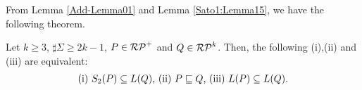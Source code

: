 From Lemma \ref{Add-Lemma01} %
and Lemma \ref{Sato1:Lemma15}, %
we have the following theorem.


\begin{thm}\label{Theorem17}%
    Let $k \geq 3$, $\sharp\Sigma \geq 2k-1$, $P \in \mathcal{RP}^{+}$ and
    $Q \in \mathcal{RP}^{k}$.
    Then, the following (i),(ii) and (iii) are equivalent:
    \[
        \begin{tabular}{ll}
            $(\mathrm{i})$ $S_{2}(P) \subseteq L(Q)$,
            $(\mathrm{ii})$ $P \sqsubseteq Q$,
            $(\mathrm{iii})$ $L(P) \subseteq L(Q)$.
        \end{tabular}
    \]
\end{thm}



